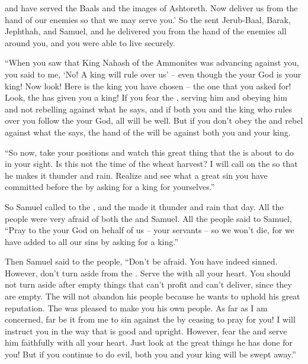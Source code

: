 {{}
and have served
the
Baals
and the images of Ashtoreth.
Now
deliver
us from the hand
of our enemies
so that we may serve you.’
So the
{}
sent
Jerub-Baal,
Barak,
Jephthah,
and Samuel,
and he delivered
you from the
hand
of the enemies
all around
you, and you were able to live
securely.
\par }{\PP {}“When you saw
that
King
Nahash
of the Ammonites
was advancing
against
you, you said
to me, ‘No! A king
will rule over us’ – even though the
{} your God is your king!
Now
look! Here is the king
you have
chosen
– the one that
you asked
for! Look,
the {}
has given
you a king!
If
you fear
the {}, serving
him and obeying him
and not
rebelling
against what he says, and if both
you
and the king
who
rules
over
you follow
the {}
your God,
all
will be
well.
But if
you don’t
obey
the {}
and rebel
against
what the
{}
says,
the hand
of the {}
will be
against both you and your king.
\par }{\PP {}“So now,
take your positions
and watch this
great
thing
that
the {}
is about
to do
in your sight.
Is this not
the time
of the wheat
harvest? I will call
on the
{}
so
that he makes
it thunder
and rain.
Realize
and see
what
a great
sin you have
committed
before
the {}
by asking
for a king for yourselves.”
\par }{\PP {}So Samuel
called
to
the {}, and the
{}
made
it thunder
and rain
that day.
All
the people
were very
afraid
of both the
{}
and Samuel.
All
the people
said
to
Samuel,
“Pray
to
the {}
your God
on behalf of us – your servants – so we won’t die, for we have added to all our sins by asking for a king.”
\par }{\PP {}Then Samuel
said
to
the people,
“Don’t
be afraid.
You
have indeed sinned.
However,
don’t
turn
aside
from the
{}. Serve
the {}
with all
your heart.
You should not
turn aside
after
empty
things that
can’t
profit
and can’t
deliver,
since
they are
empty.
The
{}
will not
abandon
his people
because
he wants to uphold
his great
reputation.
The
{}
was pleased to make
you his own people.
As
far as
I am
concerned, far be it from me
to sin
against the
{}
by ceasing
to pray
for
you! I will instruct
you in the
way
that is good
and upright.
However,
fear
the {}
and serve
him faithfully
with all
your heart.
Just
look
at the great
things he has done for you!
But if
you continue to do evil,
both
you
and your king
will be swept away.”

}
